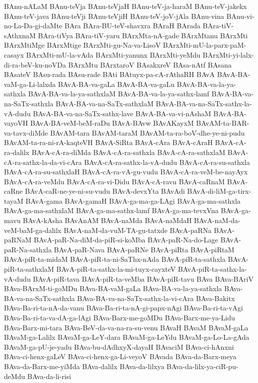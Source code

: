 {BAnu-nALaM
BAnu-teVja
BAnu-teVjaH
BAnu-teV-ja-haraM
BAnu-teV-jakekx
BAnu-teV-java
BAnu-teVji
BAnu-teVjiH
BAnu-teV-joV-jAla
BAnu-vina
BAnu-vi-no-La-Da-gi-daMte
BAra
BAra-BU-teV-shavxra
BAraH
BArada
BAra-tiV-sAthxnaM
BAra-tiVya
BAra-tiV-yaru
BArxMta-nA-gade
BArxMtanu
BArxMti
BArxMtiMge
BArxMtige
BArxMti-gu-Na-va-LisoV
BArxMti-mU-la-parx-paM-casayx
BArxMti-mU-la-vAda
BArxMti-yanunx
BArxMti-yeMdu
BArxMti-yi-lalx-di-ra-beV-ku-noVDa
BArxMtu
BArxtaroV
BAsakxreV
BAsa-nAtf
BAsana
BAsateV
BAsu-rada
BAsu-rade
BAti
BAtuyx-pa-cA-rAthaRH
BAvA
BAvA-BA-vaM-ga-Li-lalxda
BAvA-BA-va-gaLa
BAvA-BA-va-gaLu
BAvA-BA-va-la-ya-sathxla
BAvA-BA-va-la-ya-sathxlaM
BAvA-BA-va-la-ya-sathx-lamf
BAvA-BA-va-na-SaTx-sathxla
BAvA-BA-va-na-SaTx-sathxlaM
BAvA-BA-va-na-SaTx-sathx-la-vA-dudu
BAvA-BA-va-na-SaTx-sathx-lave
BAvA-BA-va-vi-nAshaM
BAvA-BA-vayoVH
BAvA-BA-veM-beM-raDu
BAvA-BAvw
BAvAKayxM
BAvAM-ta-BAR-va-tavx-diMde
BAvAM-tara
BAvAM-taraM
BAvAM-ta-ra-boV-dhe-ye-ni-pudu
BAvAM-ta-ra-ni-rA-kaqteVH
BAvA-SiRta
BAvA-cAra
BAvA-cAraH
BAvA-cA-ra-dalilx
BAvA-cA-ra-diMda
BAvA-cA-ra-sathxla
BAvA-cA-ra-sathxlaM
BAvA-cA-ra-sathx-la-da-vi-cAra
BAvA-cA-ra-sathx-la-vA-dudu
BAvA-cA-ra-su-sathxla
BAvA-cA-ra-su-sathxlaH
BAvA-cA-ra-vA-gu-vudu
BAvA-cA-ra-veM-be-nayAyx
BAvA-cA-ra-veMdu
BAvA-cA-ra-vi-Didu
BAvA-cA-ravu
BAvA-caRnaM
BAvA-caRne
BAvA-caR-ne-ye-ni-su-vudu
BAvA-devxYta
BAvAdi
BAvA-di-liM-ga-tirx-tayaM
BAvA-gama
BAvA-gamaH
BAvA-ga-ma-ga-LAgi
BAvA-ga-ma-sathxla
BAvA-ga-ma-sathxlaM
BAvA-ga-ma-sathx-lamf
BAvA-ga-ma-tevxVna
BAvA-ga-mavu
BAvA-kAsha
BAvAnAM
BAvA-naMda
BAvA-naMdaH
BAvA-naM-da-veM-baM-ga-dalilx
BAvA-naM-da-vuM-TA-gu-tatxde
BAvA-paRNa
BAvA-paRNaM
BAvA-paR-Na-diM-da-piR-si-koMba
BAvA-paR-Na-do-Lage
BAvA-paR-Na-sathxla
BAvA-paR-Nava
BAvA-paRNe
BAvA-piRta
BAvA-piRtaM
BAvA-piR-ta-midaM
BAvA-piR-ta-ni-SaThx-nAda
BAvA-piR-ta-sathxla
BAvA-piR-ta-sathxlaM
BAvA-piR-ta-sathx-la-mi-tuyx-cayxteV
BAvA-piR-ta-sathx-la-vA-dudu
BAvA-piR-tava
BAvA-piR-ta-veMba
BAvA-piR-tavu
BAva
BAva-BAriV
BAva-BArxM-ti-goMDu
BAva-BA-vaM-gaLa
BAva-BA-va-la-ya-sathxla
BAva-BA-va-na-SaTx-sathxla
BAva-BA-va-na-SaTx-sathx-la-vi-cAra
BAva-Bakitx
BAva-Ba-ri-ta-nA-da-vanu
BAva-Ba-ri-ta-nA-gi-papx-nAgi
BAva-Ba-ri-ta-vAgi
BAva-Ba-ri-ta-va-dA-ga-lAgi
BAva-Barx-me-goMDu
BAva-Barx-me-ya-Lidu
BAva-Barx-mi-tara
BAva-BeV-da-va-na-ra-su-venu
BAvaH
BAvaM
BAvaM-gaLa
BAvaM-ga-Lalilx
BAvaM-ga-LeY-dara
BAvaM-ga-LeYdu
BAvaM-ga-Lo-La-gAda
BAvaM-ga-pU-je-yadu
BAva-bu-dAdhxyX-dayaH
BAvaciM
BAva-ci-hAnxni
BAva-ci-henx-gaLeV
BAva-ci-henx-ga-Li-veyoV
BAvada
BAva-da-Barx-meya
BAva-da-Barx-me-yiMda
BAva-dalilx
BAva-da-lilxya
BAva-da-lilx-ya-ciR-pu-deMdu
BAva-da-li-risi
}
